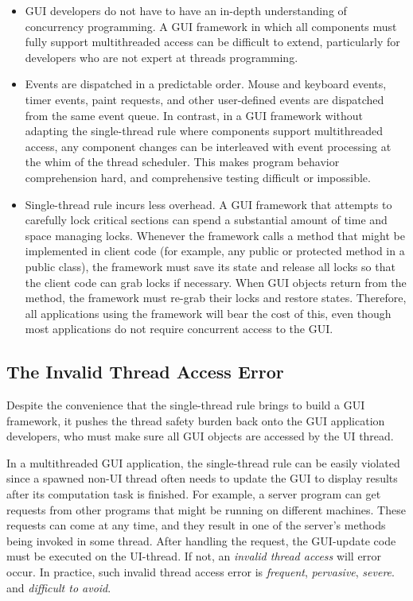 \begin{itemize}

\item GUI developers do not have to have an in-depth
understanding of concurrency programming. A GUI framework in which all components
must fully support multithreaded access can be difficult to extend, particularly
for developers who are not expert at threads programming.

\item Events are dispatched in a predictable order. Mouse and keyboard events, timer events, 
paint requests, and other user-defined events are dispatched from the same event queue.
In contrast, in a GUI framework without adapting the single-thread rule where components
support multithreaded access, any component changes can be interleaved with event
processing at the whim of the thread scheduler. This makes program behavior comprehension hard,
 and comprehensive testing difficult or impossible. 

\item Single-thread rule incurs less overhead.
A GUI framework that attempts to carefully lock critical sections can spend a substantial
amount of time and space managing locks. Whenever the framework calls a method that might
be implemented in client code (for example, any public or protected method in a public class),
the framework must save its state and release all locks so that the client code can grab locks
if necessary. When GUI objects return from the method, the framework must re-grab their locks and
restore states. Therefore, all applications using the framework will bear the cost of this, even though most
applications do not require concurrent access to the GUI.

\end{itemize}


\subsection{The Invalid Thread Access Error}

Despite the convenience that the single-thread rule brings to build a
GUI framework, it pushes the thread safety burden back onto the GUI application developers,
who must make sure all GUI objects are accessed by the UI thread.

In a multithreaded GUI application, the single-thread rule can be
easily violated since a spawned non-UI thread often needs to update
the GUI to display results after its computation task is finished.
For example, a server program can get requests from other programs
that might be running on different machines. These requests can come at any time,
and they result in one of the server's methods being invoked in some thread.
After handling the request, the GUI-update code must be executed on the UI-thread.
If not, an \textit{invalid thread access} will error occur. In practice, such
invalid thread access error is \textit{frequent}, \textit{pervasive}, \textit{severe}.
and \textit{difficult to avoid}.

